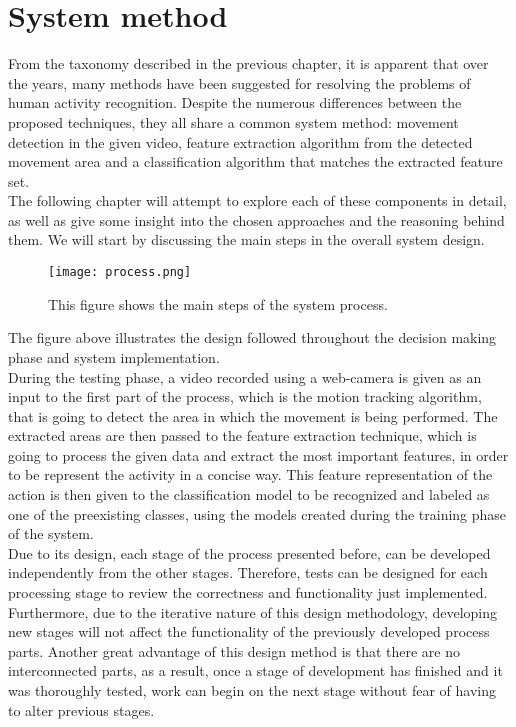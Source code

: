 \documentclass[11pt]{report}
\begin{document}
\clearpage

\chapter{System method}
From the taxonomy described in the previous chapter, it is apparent that over the years, many methods have been suggested for resolving the problems of human activity recognition. Despite the numerous differences between the proposed techniques, they all share a common system method: movement detection in the given video, feature extraction algorithm from the detected movement area and a classification algorithm that matches the extracted feature set. \\
The following chapter will  attempt to explore each of these components in detail, as well as give some insight into the chosen approaches and the reasoning behind them. We will start by discussing the main steps in the overall system design.\\

\begin{figure}
    \centering
    \texttt{[image: process.png]}
    \caption{This figure shows the main steps of the system process.}
    \label{fig:process}
\end{figure}

The figure above illustrates the design followed throughout the decision making phase and system implementation. \\
During the testing phase, a video recorded using a web-camera is given as an input to the first part of the process, which is the motion tracking algorithm, that is going to detect the area in which the movement is being performed. The extracted areas are then passed to the feature extraction technique, which is going to process the given data and extract the most important features, in order to be represent the activity in a concise way. This feature representation of the action is then given to the classification model to be recognized and labeled as one of the preexisting classes, using the models created during the training phase of the system.\\

Due to its design, each stage of the process presented before, can be developed independently from the other stages. Therefore, tests can be designed for each processing stage to review the correctness and functionality just implemented. Furthermore, due to the iterative nature of this design methodology, developing new stages will not affect the functionality of the previously developed process parts. Another great advantage of this design method is that there are no interconnected parts, as a result, once a stage of development has finished and it was thoroughly tested, work can begin on the next stage without fear of having to alter previous stages. \\
\end{document}
